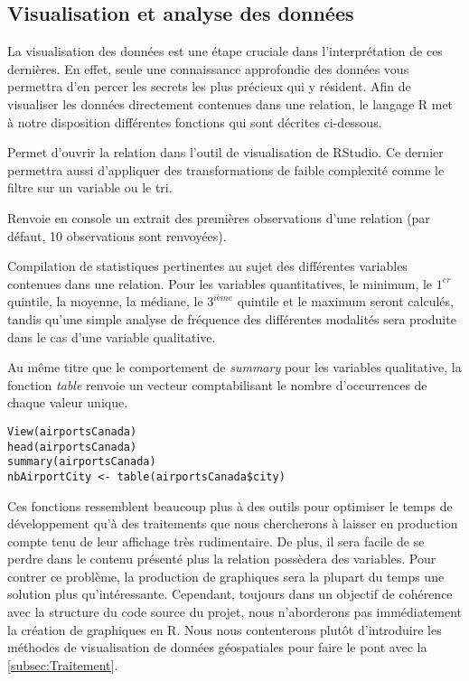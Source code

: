 \subsection{Visualisation et analyse des données}
\label{subsec:Visualisation}

La visualisation des données est une étape cruciale dans l’interprétation de ces dernières. En effet, seule une connaissance approfondie des données vous permettra d'en percer les secrets les plus précieux qui y résident. Afin de visualiser les données directement contenues dans une relation, le langage R met à notre disposition différentes fonctions qui sont décrites ci-dessous. 

\begin{description}[style=multiline,leftmargin=2cm]
		\item[\emph{View}] Permet d'ouvrir la relation dans l'outil de visualisation de RStudio. Ce dernier permettra aussi d'appliquer des transformations de faible complexité comme le filtre sur un variable ou le tri. \cite{Rfunction:View}
		\item[\emph{head}] Renvoie en console un extrait des premières observations d'une relation (par défaut, 10 observations sont renvoyées). \cite{Rfunction:head}
		\item[\emph{summary}] Compilation de statistiques pertinentes au sujet des différentes variables contenues dans une relation. Pour les variables quantitatives, le minimum, le $1^{er}$ quintile, la moyenne, la médiane, le $3^{ième}$ quintile et le maximum seront calculés, tandis qu'une simple analyse de fréquence des différentes modalités sera produite dans le cas d'une variable qualitative.
		\item[\emph{table}] Au même titre que le comportement de \emph{summary} pour les variables qualitative, la fonction \emph{table} renvoie un vecteur comptabilisant le nombre d'occurrences de chaque valeur unique. \cite{Rfunction:table}
\end{description}

\begin{lstlisting}[caption = Fonctions de visualisation de données,label=src:DataVisual]
View(airportsCanada)
head(airportsCanada)
summary(airportsCanada)
nbAirportCity <- table(airportsCanada$city) 
\end{lstlisting}

\vspace{\baselineskip}
\noindent
Ces fonctions ressemblent beaucoup plus à des outils pour optimiser le temps de développement qu'à des traitements que nous chercherons à laisser en production compte tenu de leur affichage très rudimentaire. De plus, il sera facile de se perdre dans le contenu présenté plus la relation possèdera des variables. Pour contrer ce problème, la production de graphiques sera la plupart du temps une solution plus qu'intéressante. Cependant, toujours dans un objectif de cohérence avec la structure du code source du projet, nous n'aborderons pas immédiatement la création de graphiques en R. Nous nous contenterons plutôt d'introduire les méthodes de visualisation de données géospatiales pour faire le pont avec la \autoref{subsec:Traitement}.\\

